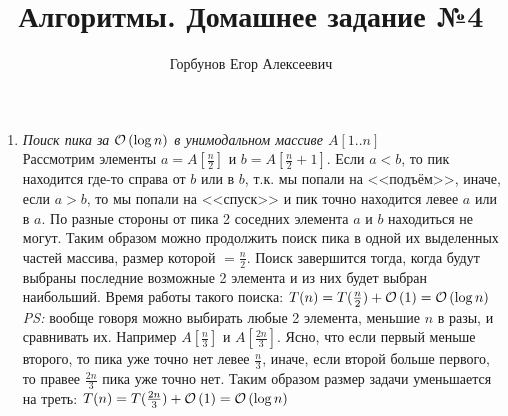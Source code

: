 
\title{Алгоритмы. Домашнее задание №4}
\author{Горбунов Егор Алексеевич}


\maketitle

\begin{enumerate}[label={\textbf{(\alph*)}}]

\item \textit{Поиск пика за $\mathcal{O}\left(\log{n}\right)$ в унимодальном массиве $A[1..n]$}\\
Рассмотрим элементы $a = A[\frac{n}{2}]$ и $b = A[\frac{n}{2}+1]$. Если $a < b$, то
пик находится где-то справа от $b$ или в $b$, т.к. мы попали на <<подъём>>, иначе, если $a > b$, то
мы попали на <<спуск>> и пик точно находится левее $a$ или в $a$. По разные стороны от пика 2 соседних 
элемента $a$ и $b$ находиться не могут. Таким образом можно продолжить поиск пика в одной их выделенных частей
массива, размер которой $=\frac{n}{2}$. Поиск завершится тогда, когда будут выбраны последние возможные 2 элемента и из них будет выбран наибольший. Время работы такого поиска: $T(n)=T(\frac{n}{2})+\mathcal{O}\left(1\right)=\mathcal{O}\left(\log{n}\right)$\\
\textit{PS:} вообще говоря можно выбирать любые 2 элемента, меньшие $n$ в разы, и сравнивать их. Например 
$A[\frac{n}{3}]$ и $A[\frac{2n}{3}]$. Ясно, что если первый меньше второго, то пика уже точно нет левее $\frac{n}{3}$, иначе, если второй больше первого, то правее $\frac{2n}{3}$ пика уже точно нет. Таким образом размер задачи уменьшается на треть: $T(n)=T(\frac{2n}{3})+\mathcal{O}\left(1\right)=\mathcal{O}\left(\log{n}\right)$


\end{enumerate}

